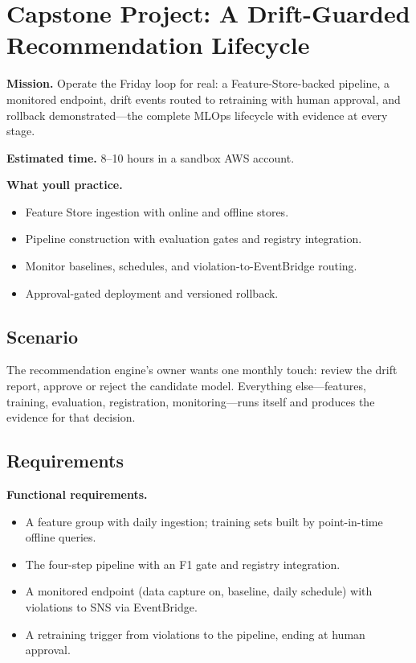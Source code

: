 \section{Capstone Project: A Drift-Guarded Recommendation Lifecycle}\label{sec:ch19-capstone}

\begin{capstonebox}
\textbf{Mission.} Operate the Friday loop for real: a Feature-Store-backed pipeline, a monitored endpoint, drift events routed to retraining with human approval, and rollback demonstrated---the complete MLOps lifecycle with evidence at every stage.

\textbf{Estimated time.} 8--10 hours in a sandbox AWS account.

\textbf{What you\textquotesingle{}ll practice.}
\begin{itemize}
    \item Feature Store ingestion with online and offline stores.
    \item Pipeline construction with evaluation gates and registry integration.
    \item Monitor baselines, schedules, and violation-to-EventBridge routing.
    \item Approval-gated deployment and versioned rollback.
\end{itemize}
\end{capstonebox}

\subsection*{Scenario}
The recommendation engine's owner wants one monthly touch: review the drift report, approve or reject the candidate model. Everything else---features, training, evaluation, registration, monitoring---runs itself and produces the evidence for that decision.

\subsection*{Requirements}
\textbf{Functional requirements.}
\begin{itemize}
    \item A feature group with daily ingestion; training sets built by point-in-time offline queries.
    \item The four-step pipeline with an F1 gate and registry integration.
    \item A monitored endpoint (data capture on, baseline, daily schedule) with violations to SNS via EventBridge.
    \item A retraining trigger from violations to the pipeline, ending at human approval.
\end{itemize}

